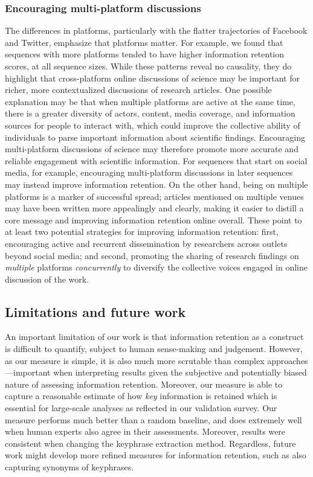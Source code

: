 \documentclass[letterpaper]{article} %
\begin{document}
\subsubsection{Encouraging multi-platform discussions}
The differences in platforms, particularly with the flatter trajectories of Facebook and Twitter, emphasize that platforms matter. For example, we found that sequences with more platforms tended to have higher information retention scores, at all sequence sizes. While these patterns reveal no causality, they do highlight that cross-platform online discussions of science may be important for richer, more contextualized discussions of research articles. One possible explanation may be that when multiple platforms are active at the same time, there is a greater diversity of actors, content, media coverage, and information sources for people to interact with, which could improve the collective ability of individuals to parse important information about scientific findings.
Encouraging multi-platform discussions of science may therefore promote more accurate and reliable engagement with scientific information. For sequences that start on social media, for example, encouraging multi-platform discussions in later sequences may instead improve information retention.
On the other hand, being on multiple platforms is a marker of successful spread; articles mentioned on multiple venues may have been written more appealingly and clearly, making it easier to distill a core message and improving information retention online overall.
These point to at least two potential strategies for improving information retention: first, encouraging active and recurrent dissemination by researchers across outlets beyond social media; and second, promoting the sharing of research findings on \textit{multiple} platforms \textit{concurrently} to diversify the collective voices engaged in online discussion of the work.

\subsection{Limitations and future work}
An important limitation of our work is that information retention as a construct is difficult to quantify, subject to human sense-making and judgement. However, as our measure is simple, it is also much more scrutable than complex approaches---important when interpreting results given the subjective and potentially biased nature of assessing information retention. Moreover, our measure is able to capture a reasonable estimate of how \textit{key} information is retained which is essential for large-scale analyses as reflected in our validation survey. Our measure performs much better than a random baseline, and does extremely well when human experts also agree in their assessments. Moreover, results were consistent when changing the keyphrase extraction method. Regardless, future work might develop more refined measures for information retention, such as also capturing synonyms of keyphrases.
\end{document}
